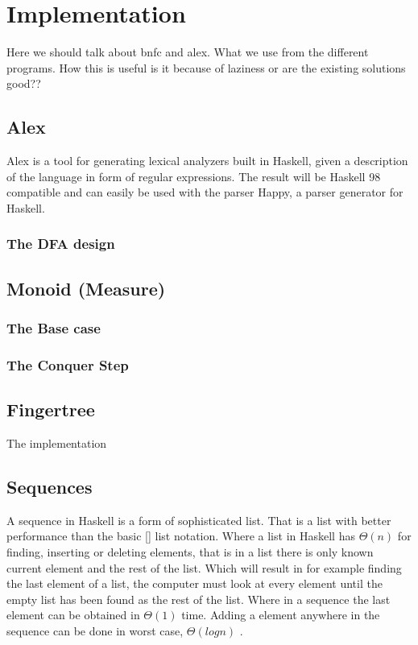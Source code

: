 \chapter{Implementation}
Here we should talk about bnfc and
alex. What we use from the different programs. How this is useful
is it because of laziness or are the existing solutions good??

\section{Alex}
Alex is a tool for generating lexical analyzers built in Haskell, given a description of the language
in form of regular expressions. The result will be Haskell 98 compatible and can easily be used with the
parser Happy, a parser generator for Haskell.
\subsection{The DFA design}

\section{Monoid (Measure)}
\subsection{The Base case}
\subsection{The Conquer Step}

\section{Fingertree}
The implementation

\section{Sequences}
A sequence in Haskell is a form of sophisticated list. That is a list with better performance than the basic [] list notation. Where a list in Haskell has $\Theta(n)$ for finding, inserting or deleting elements, that is in a list there is only known current element and the rest of the list. Which will result in for example finding the last element of a list, the computer must look at every element until the empty list has been found as the rest of the list. Where in a sequence the last element can be obtained in $\Theta(1)$ time. Adding a element anywhere in the sequence can be done in worst case, $\Theta(log n)$ \cite{fingertree}. 

